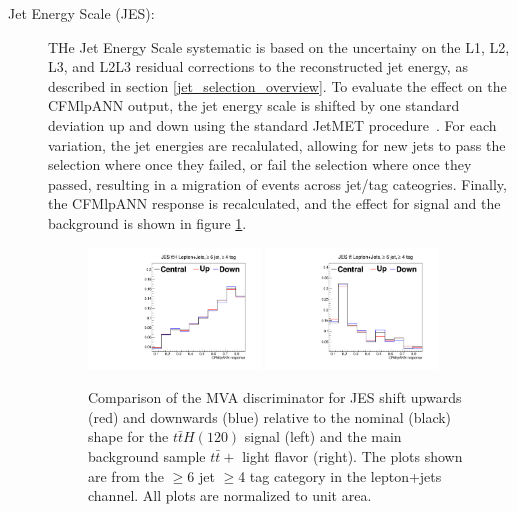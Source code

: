\begin{description}
  \item[Jet Energy Scale (JES):]  THe Jet Energy Scale systematic is
    based on the uncertainy on the L1, L2, L3, and L2L3 residual
    corrections to the reconstructed jet energy, as described in
    section \ref{jet_selection_overview}.  To evaluate the effect on
    the CFMlpANN output, the jet energy scale is shifted by one
    standard deviation up and down using the standard JetMET
    procedure~\cite{JESJetMET}.  For each variation, the jet energies 
    are recalulated, allowing for new jets to pass the selection where
    once they failed, or fail the selection where once they passed,
    resulting in a migration of events across jet/tag cateogries.
    Finally, the CFMlpANN response is recalculated, and the effect for
    signal and the \ttjets background is shown in figure
    \ref{fig:JESShift}. 

\begin{figure}[h]
  \centering
   \includegraphics[width=0.45\textwidth]{Figures/Analysis_1_Diagrams/SystPlot_CMS_scale_j_ttH120_ljets_jge6_tge4.pdf}
   \includegraphics[width=0.45\textwidth]{Figures/Analysis_1_Diagrams/SystPlot_CMS_scale_j_ttbar_ljets_jge6_tge4.pdf}
   \caption{ Comparison of the MVA discriminator for JES shift upwards
     (red) and downwards (blue) relative to the nominal (black) shape
     for the $t\bar{t}H(120)$ signal (left) and the main background sample
     $t\bar{t}+$ light flavor (right).  The plots shown are from the
     $\ge$6 jet $\ge$4 tag category in the lepton+jets channel.  All plots are normalized to unit area.}\label{fig:JESShift}
\end{figure}



\end{description}
